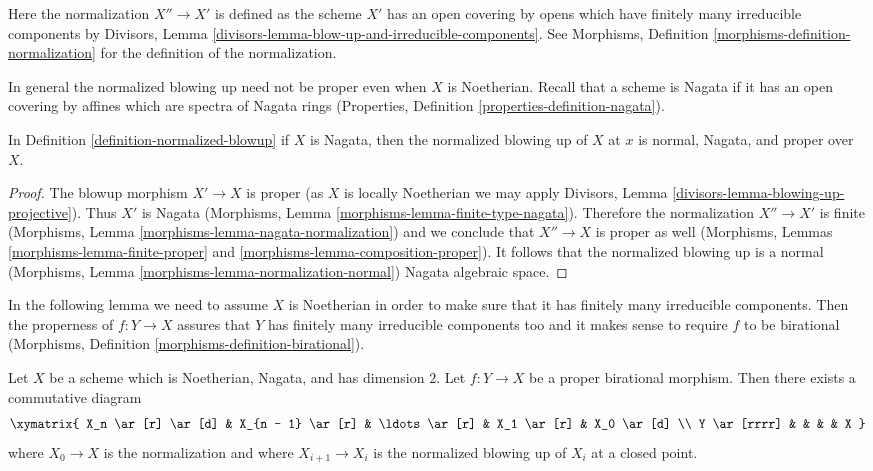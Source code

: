 \noindent
Here the normalization $X'' \to X'$ is defined as the scheme $X'$
has an open covering by opens which have finitely many irreducible
components by
Divisors, Lemma \ref{divisors-lemma-blow-up-and-irreducible-components}.
See Morphisms, Definition \ref{morphisms-definition-normalization}
for the definition of the normalization.

\medskip\noindent
In general the normalized blowing up need not be proper even
when $X$ is Noetherian. Recall that a scheme is Nagata if it
has an open covering by affines which are spectra of Nagata rings
(Properties, Definition \ref{properties-definition-nagata}).

\begin{lemma}
\label{lemma-Nagata-normalized-blowup}
In Definition \ref{definition-normalized-blowup} if $X$ is Nagata,
then the normalized blowing up of $X$ at $x$ is
normal, Nagata, and proper over $X$.
\end{lemma}

\begin{proof}
The blowup morphism $X' \to X$ is proper
(as $X$ is locally Noetherian we may apply
Divisors, Lemma \ref{divisors-lemma-blowing-up-projective}).
Thus $X'$ is Nagata
(Morphisms, Lemma \ref{morphisms-lemma-finite-type-nagata}).
Therefore the normalization $X'' \to X'$ is finite
(Morphisms, Lemma \ref{morphisms-lemma-nagata-normalization})
and we conclude that $X'' \to X$ is proper as well
(Morphisms, Lemmas \ref{morphisms-lemma-finite-proper} and
\ref{morphisms-lemma-composition-proper}).
It follows that the normalized blowing up
is a normal (Morphisms, Lemma
\ref{morphisms-lemma-normalization-normal})
Nagata algebraic space.
\end{proof}

\noindent
In the following lemma we need to assume $X$ is Noetherian in order
to make sure that it has finitely many irreducible components.
Then the properness of $f : Y \to X$ assures that $Y$ has finitely
many irreducible components too and it makes sense to require
$f$ to be birational
(Morphisms, Definition \ref{morphisms-definition-birational}).

\begin{lemma}
\label{lemma-dominate-by-normalized-blowing-up}
Let $X$ be a scheme which is Noetherian, Nagata, and has dimension $2$.
Let $f : Y \to X$ be a proper birational morphism.
Then there exists a commutative diagram
$$
\xymatrix{
X_n \ar[r] \ar[d] &
X_{n - 1} \ar[r] &
\ldots \ar[r] &
X_1 \ar[r] &
X_0 \ar[d] \\
Y \ar[rrrr]  & & & & X
}
$$
where $X_0 \to X$ is the normalization and
where $X_{i + 1} \to X_i$ is the normalized blowing up of $X_i$ at a closed
point.
\end{lemma}

